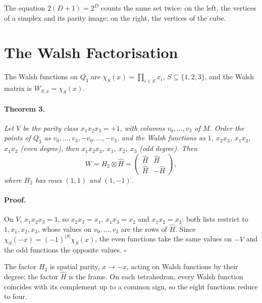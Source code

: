 \documentclass[twocolumn]{iopjournal}
\begin{document}
\medskip
\noindent
The equation $2(D+1) = 2^D$ counts the same set twice: on the left,
the vertices of a simplex and its parity image; on the right, the
vertices of the cube.


\section*{The Walsh Factorisation}

The Walsh functions on $Q_3$ are
$\chi_S(x) = \prod_{i \in S} x_i$, $S \subseteq \{1,2,3\}$, and the
Walsh matrix is $W_{S,x} = \chi_S(x)$.

\paragraph{Theorem 3.} \textit{Let $V$ be the parity class
$x_1x_2x_3 = +1$, with columns $v_0, \dots, v_3$ of $M$. Order the
points of $Q_3$ as $v_0, \dots, v_3, -v_0, \dots, -v_3$, and the
Walsh functions as $1$, $x_2x_3$, $x_1x_3$, $x_1x_2$ (even degree),
then $x_1x_2x_3$, $x_1$, $x_2$, $x_3$ (odd degree). Then}
\begin{equation}
  W = H_2 \otimes \hat H = \begin{pmatrix}
    \hat H & \hat H \\ \hat H & -\hat H \end{pmatrix},
\end{equation}
\textit{where $H_2$ has rows $(1, 1)$ and $(1, -1)$.}

\paragraph{Proof.} On $V$, $x_1x_2x_3 = 1$, so $x_2x_3 = x_1$,
$x_1x_3 = x_2$ and $x_1x_2 = x_3$: both lists restrict to
$1, x_1, x_2, x_3$, whose values on $v_0, \dots, v_3$ are the rows
of $\hat H$. Since $\chi_S(-x) = (-1)^{|S|}\chi_S(x)$, the even
functions take the same values on $-V$ and the odd functions the
opposite values. \hfill $\square$

\medskip
\noindent
The factor $H_2$ is spatial parity, $x \to -x$, acting on Walsh
functions by their degree; the factor $\hat H$ is the frame. On
each tetrahedron, every Walsh function coincides with its
complement up to a common sign, so the eight functions reduce to
four.

\end{document}
